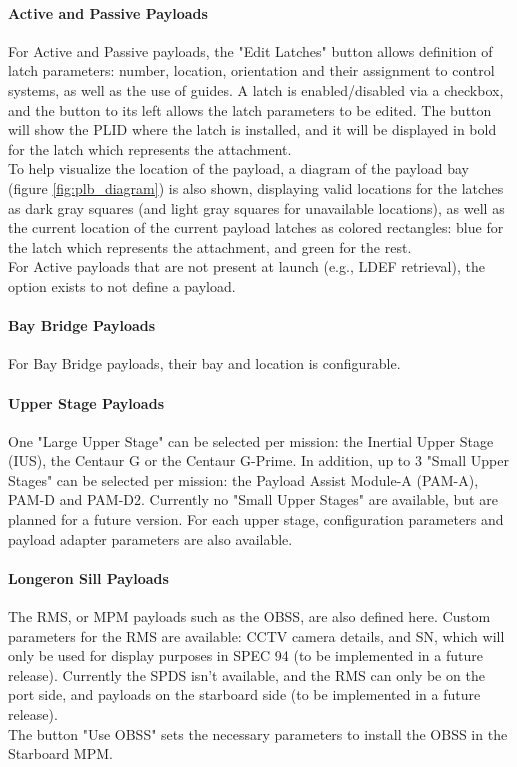 \documentclass[Space_Shuttle_Vessel_Manual.tex]{subfiles}
\begin{document}
\begin{multicols*}{2}
\paragraph{Active and Passive Payloads}
For Active and Passive payloads, the "Edit Latches" button allows definition of latch parameters: number, location, orientation and their assignment to control systems, as well as the use of guides. A latch is enabled/disabled via a checkbox, and the button to its left allows the latch parameters to be edited. The button will show the PLID where the latch is installed, and it will be displayed in bold for the latch which represents the attachment.\\
To help visualize the location of the payload, a diagram of the payload bay (figure \ref{fig:plb_diagram}) is also shown, displaying valid locations for the latches as dark gray squares (and light gray squares for unavailable locations), as well as the current location of the current payload latches as colored rectangles: blue for the latch which represents the attachment, and green for the rest.\\
For Active payloads that are not present at launch (e.g., LDEF retrieval), the option exists to not define a payload.

\paragraph{Bay Bridge Payloads}
For Bay Bridge payloads, their bay and location is configurable.

\paragraph{Upper Stage Payloads}
One "Large Upper Stage" can be selected per mission: the Inertial Upper Stage (IUS), the Centaur G or the Centaur G-Prime. In addition, up to 3 "Small Upper Stages" can be selected per mission: the Payload Assist Module-A (PAM-A), PAM-D and PAM-D2. Currently no "Small Upper Stages" are available, but are planned for a future version. For each upper stage, configuration parameters and payload adapter parameters are also available.

\paragraph{Longeron Sill Payloads}
The RMS, or MPM payloads such as the OBSS, are also defined here. Custom parameters for the RMS are available: CCTV camera details, and SN, which will only be used for display purposes in SPEC 94 (to be implemented in a future release). Currently the SPDS isn't available, and the RMS can only be on the port side, and payloads on the starboard side (to be implemented in a future release).\\
The button "Use OBSS" sets the necessary parameters to install the OBSS in the Starboard MPM.



\end{multicols*}
\end{document}
